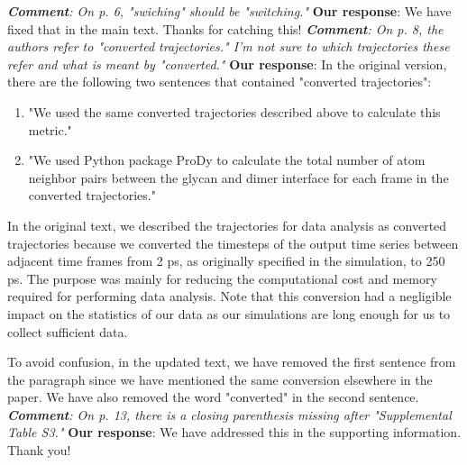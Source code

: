 \documentclass[9pt]{elife}
\begin{document}
\newline
\newline
\indent
\textit{\textbf{Comment}:
On p. 6, "swiching" should be "switching."}
\newline
\indent 
{\bf Our response}: We have fixed that in the main text. Thanks for catching this!
\newline
\newline
\indent
\textit{\textbf{Comment}:
On p. 8, the authors refer to "converted trajectories."  I'm not sure to which trajectories these refer and what is meant by "converted."}
\newline
\indent 
{\bf Our response}:
In the original version, there are the following two sentences that contained "converted trajectories":

\begin{enumerate}[label={(\arabic*)}]
\item "We used the same converted trajectories described above to calculate this metric."
\item "We used Python package ProDy to calculate the total number of atom neighbor pairs between the glycan and dimer interface for each frame in the converted trajectories."
\end{enumerate}

In the original text, we described the trajectories for data analysis as converted trajectories because we converted the timesteps of the output time series between adjacent time frames from 2 ps, as originally specified in the simulation, to 250 ps. The purpose was mainly for reducing the computational cost and memory required for performing data analysis. Note that this conversion had a negligible impact on the statistics of our data as our simulations are long enough for us to collect sufficient data.

To avoid confusion, in the updated text, we have removed the first sentence from the paragraph since we have mentioned the same conversion elsewhere in the paper. We have also removed the word "converted" in the second sentence.
\newline
\newline
\indent
\textit{\textbf{Comment}:
On p. 13, there is a closing parenthesis missing after "Supplemental Table S3."}
\newline
\indent 
{\bf Our response}: We have addressed this in the supporting information. Thank you!
\end{document}
